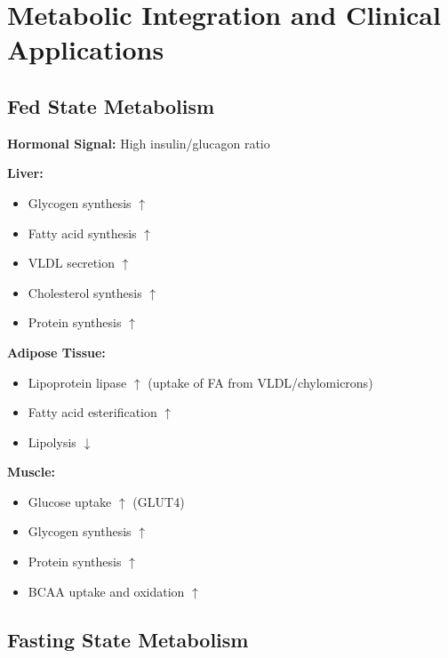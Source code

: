 
\section{Metabolic Integration and Clinical Applications}

\subsection{Fed State Metabolism}

\begin{tcolorbox}[colback=green!5, colframe=green!70!black, title=\textbf{Fed State: Anabolic Predominance}]
\textbf{Hormonal Signal:} High insulin/glucagon ratio

\textbf{Liver:}
\begin{itemize}
    \item Glycogen synthesis $\uparrow$
    \item Fatty acid synthesis $\uparrow$
    \item VLDL secretion $\uparrow$
    \item Cholesterol synthesis $\uparrow$
    \item Protein synthesis $\uparrow$
\end{itemize}

\textbf{Adipose Tissue:}
\begin{itemize}
    \item Lipoprotein lipase $\uparrow$ (uptake of FA from VLDL/chylomicrons)
    \item Fatty acid esterification $\uparrow$
    \item Lipolysis $\downarrow$
\end{itemize}

\textbf{Muscle:}
\begin{itemize}
    \item Glucose uptake $\uparrow$ (GLUT4)
    \item Glycogen synthesis $\uparrow$
    \item Protein synthesis $\uparrow$
    \item BCAA uptake and oxidation $\uparrow$
\end{itemize}
\end{tcolorbox}

\subsection{Fasting State Metabolism}

